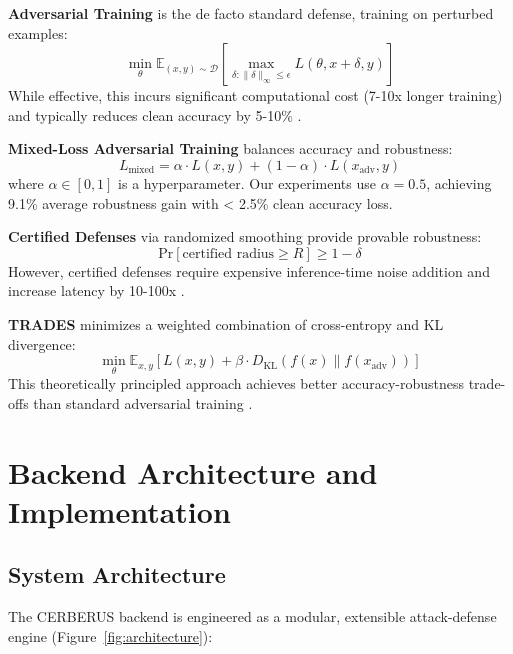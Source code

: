 \documentclass[10pt,conference]{IEEEtran}
\begin{document}
\textbf{Adversarial Training} \cite{madry2018towards} is the de facto standard defense, training on perturbed examples:
\begin{equation}
\min_\theta \mathbb{E}_{(x,y) \sim \mathcal{D}} \left[ \max_{\delta: \|\delta\|_\infty \leq \epsilon} L(\theta, x+\delta, y) \right]
\end{equation}
While effective, this incurs significant computational cost (7-10x longer training) and typically reduces clean accuracy by 5-10\% \cite{tsipras2018robustness}.

\textbf{Mixed-Loss Adversarial Training} \cite{wang2019improving} balances accuracy and robustness:
\begin{equation}
L_{\text{mixed}} = \alpha \cdot L(x, y) + (1-\alpha) \cdot L(x_{\text{adv}}, y)
\end{equation}
where $\alpha \in [0,1]$ is a hyperparameter. Our experiments use $\alpha = 0.5$, achieving 9.1\% average robustness gain with < 2.5\% clean accuracy loss.

\textbf{Certified Defenses} \cite{cohen2019certified} via randomized smoothing provide provable robustness:
\begin{equation}
\text{Pr}[\text{certified radius} \geq R] \geq 1 - \delta
\end{equation}
However, certified defenses require expensive inference-time noise addition and increase latency by 10-100x \cite{cohen2019certified}.

\textbf{TRADES} \cite{zhang2019theoretically} minimizes a weighted combination of cross-entropy and KL divergence:
\begin{equation}
\min_\theta \mathbb{E}_{x,y} \left[ L(x,y) + \beta \cdot D_{\text{KL}}(f(x) \| f(x_{\text{adv}})) \right]
\end{equation}
This theoretically principled approach achieves better accuracy-robustness trade-offs than standard adversarial training \cite{zhang2019theoretically}.

\section{Backend Architecture and Implementation}
\label{sec:backend}

\subsection{System Architecture}

The CERBERUS backend is engineered as a modular, extensible attack-defense engine (Figure~\ref{fig:architecture}):
\end{document}

